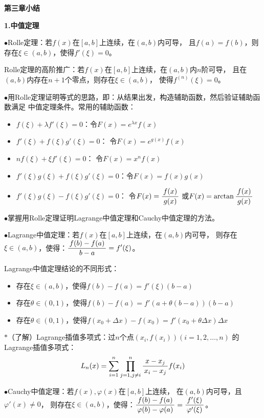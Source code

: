 \fi

\newpage

\begin{center}
	\Large\bf 第三章小结
\end{center}

{\bf 1.中值定理}

$\bullet$Rolle定理：若$f(x)$在$[a,b]$上连续，在$(a,b)$内可导，
且$f(a)=f(b)$，则存在$\xi\in(a,b)$，使得$f'(\xi)=0$。

Rolle定理的高阶推广：若$f(x)$在$[a,b]$上连续，在$(a,b)$内$n$阶可导，
且在$(a,b)$内存在$n+1$个零点，则存在$\xi\in(a,b)$，
使得$f^{(n)}(\xi)=0$。

$\bullet$用Rolle定理证明等式的思路，即：从结果出发，构造辅助函数，然后验证辅助函数满足
中值定理条件。常用的辅助函数：
\begin{itemize}
  \setlength{\itemindent}{1cm}
  \item $f(\xi)+\lambda f'(\xi)=0$：令$F(x)=e^{\lambda x}f(x)$
  \item $f'(\xi)+f(\xi)g'(\xi)=0$： 令$F(x)=e^{g(x)}f(x)$
  \item $nf(\xi)+\xi f'(\xi)=0$： 令$F(x)=x^nf(x)$ 
  \item $f'(\xi)g(\xi)+f(\xi)g'(\xi)=0$：令$F(x)=f(x)g(x)$
  \item $f'(\xi)g(\xi)-f(\xi)g'(\xi)=0$： 令$F(x)=\displaystyle\frac{\,{f(x)}\,}{\,{g(x)}\,}$
  或$F(x)=\arctan\displaystyle\frac{\,{f(x)}\,}{\,{g(x)}\,}$
\end{itemize}

$\bullet$掌握用Rolle定理证明Lagrange中值定理和Cauchy中值定理的方法。

$\bullet$Lagrange中值定理：若$f(x)$在$[a,b]$上连续，在$(a,b)$内可导，
则存在$\xi\in(a,b)$，使得：$\displaystyle\frac{\,{f(b)-f(a)}\,}{\,{b-a}\,}=f'(\xi)$。

Lagrange中值定理结论的不同形式：
\begin{itemize}
  \setlength{\itemindent}{1cm}
  \item 存在$\xi\in(a,b)$，使得$f(b)-f(a)=f'(\xi)(b-a)$
  \item 存在$\theta\in(0,1)$，使得$f(b)-f(a)
  =f'(a+\theta(b-a))(b-a)$
  \item 存在$\theta\in(0,1)$，使得$f(x_0+\Delta x)-f(x_0)
  =f'(x_0+\theta\Delta x)\Delta x$ 
\end{itemize}

$*$（了解）Lagrange插值多项式：过$n$个点$(x_i,f(x_i))(i=1,2,\ldots,n)$
的Lagrange插值多项式：
$$L_n(x)=\sum\limits_{i=1}^n\prod_{j=1,j\ne i}^{n}
\displaystyle\frac{\,{x-x_j}\,}{\,{x_i-x_j}\,}f(x_i)$$

$\bullet$Cauchy中值定理：若$f(x),\varphi(x)$在$[a,b]$上连续，
在$(a,b)$内可导，且$\varphi'(x)\ne0$，
则存在$\xi\in(a,b)$，使得：$\displaystyle\frac{\,{f(b)-f(a)}\,}{\,{\varphi(b)-\varphi(a)}\,}=
\displaystyle\frac{\,{f'(\xi)}\,}{\,{\varphi'(\xi)}\,}$。

